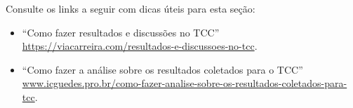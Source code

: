\noindent
Consulte os links a seguir com dicas úteis para esta seção:

\begin{itemize}
    \item ``Como fazer resultados e discussões no TCC'' \url{https://viacarreira.com/resultados-e-discussoes-no-tcc}.
    \item ``Como fazer a análise sobre os resultados coletados para o TCC'' \url{www.icguedes.pro.br/como-fazer-analise-sobre-os-resultados-coletados-para-tcc}.
\end{itemize}

